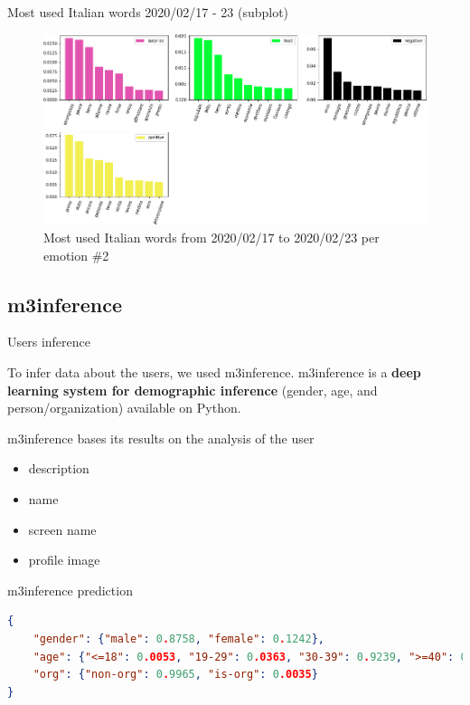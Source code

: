 \documentclass[8pt]{beamer}  %
\begin{document}
\begin{frame}{Most used Italian words 2020/02/17 - 23 (subplot)}
	
	\begin{figure}[h]
    	\includegraphics[scale=.32]{assets/img/it_2020_02_17_most_used_words_subplots_2.png}
    	\caption{Most used Italian words from 2020/02/17 to 2020/02/23 per emotion \#2}
    	\label{fig:it_2020_02_17_most_used_words_subplots_2}
    \end{figure}
	
\end{frame}

\subsection{m3inference}
\begin{frame}[fragile]{Users inference}

	To infer data about the users, we used m3inference\autocite{wang2019demographic}. m3inference is a \textbf{deep learning system for demographic inference} (gender, age, and person/organization) available on Python.
	
	m3inference bases its results on the analysis of the user
	
	\begin{itemize}
	    \item description
	    \item name 
	    \item screen name
	    \item profile image
	\end{itemize}
	
	\begin{block}{m3inference prediction}
	    \begin{lstlisting}[language=json]
{
    "gender": {"male": 0.8758, "female": 0.1242}, 
    "age": {"<=18": 0.0053, "19-29": 0.0363, "30-39": 0.9239, ">=40": 0.0346}, 
    "org": {"non-org": 0.9965, "is-org": 0.0035}
}
	    \end{lstlisting}
	\end{block}
	
\end{frame}
\end{document}
